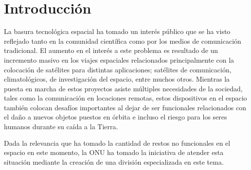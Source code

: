 \section{Introducción}\label{Sec:Introduction}

La basura tecnológica espacial ha tomado un interés público que se ha visto reflejado tanto en la comunidad científica como por los medios de comunicación tradicional. El aumento en el interés a este problema es resultado de un incremento masivo en los viajes espaciales relacionados principalmente con la colocación de satélites para distintas aplicaciones; satélites de comunicación, climatológicos, de investigación del espacio, entre muchos otros. Mientras la puesta en marcha de estos proyectos asiste múltiples necesidades de la sociedad, tales como la comunicación en locaciones remotas, estos dispositivos en el espacio también colocan desafíos importantes al dejar de ser funcionales relacionados con el daño a nuevos objetos puestos en órbita e incluso el riesgo para los seres humanos durante su caída a la Tierra.

Dada la relevancia que ha tomado la cantidad de restos no funcionales en el espacio en este momento, la ONU ha tomado la iniciativa de atender esta situación mediante la creación de una división especializada en este tema.
